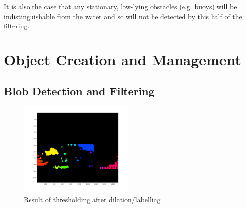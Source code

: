 \documentclass{article}
\begin{document}
It is also the case that any stationary, low-lying obstacles (e.g. buoys)
will be indistinguishable from the water and so will not be detected
by this half of the filtering.

\section{Object Creation and Management}

\subsection{Blob Detection and Filtering}

\begin{figure}
\centering
\includegraphics[width=0.5\textwidth]{threshold_bwlabel}
\caption{Result of thresholding after dilation/labelling}
\label{fig:threshold_bwlabel}
\end{figure}
\end{document}
